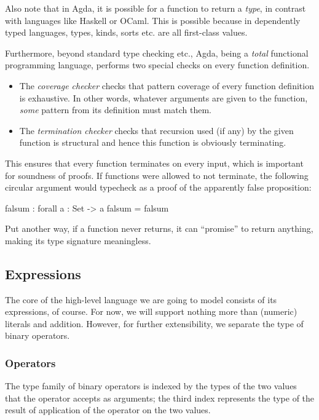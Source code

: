 Also note that in Agda, it is possible for a function to return a \emph{type}, in contrast
with languages like Haskell or OCaml. This is possible because in dependently typed languages,
types, kinds, sorts etc. are all first-class values.

Furthermore, beyond standard type checking etc., Agda, being a \emph{total} functional
programming language, performs two special checks on every function definition.
\begin{itemize}
	\item The \emph{coverage checker} checks that pattern coverage of every
		function definition is exhaustive. In other words, whatever arguments
		are given to the function, \emph{some} pattern from its definition must match
		them.
	\item The \emph{termination checker} checks that recursion used (if any) by the
		given function is structural and hence this function is obviously terminating.
\end{itemize}
This ensures that every function terminates on every input, which is important for soundness
of proofs. If functions were allowed to not terminate, the following circular argument would
typecheck as a proof of the apparently false proposition:
\begin{code}
  falsum : forall {a : Set} -> a
  falsum = falsum
\end{code}
Put another way, if a function never returns, it can ``promise'' to return anything, making
its type signature meaningless.

\subsection{Expressions}

The core of the high-level language we are going to model consists of its expressions, of
course. For now, we will support nothing more than (numeric) literals and addition.
However, for further extensibility, we separate the type of binary operators.

\subsubsection{Operators}

The type family of binary operators is indexed by the types of the two values that
the operator accepts as arguments; the third index represents the type of
the result of application of the operator on the two values.

